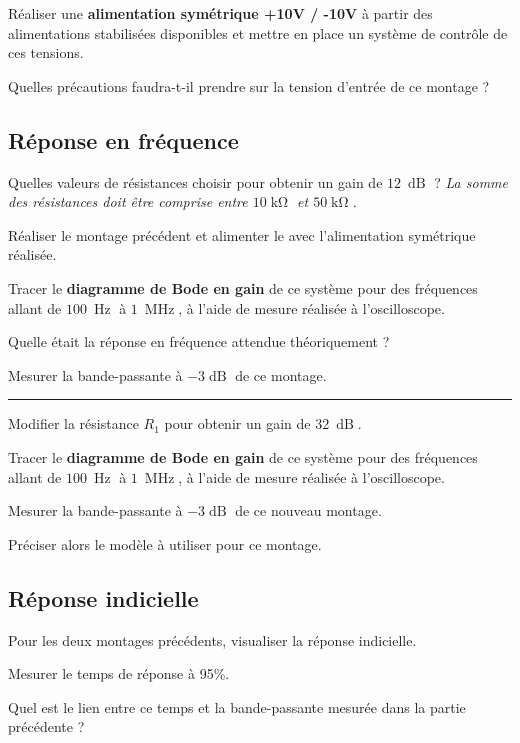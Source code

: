 \Manip Réaliser une \textbf{alimentation symétrique +10V / -10V} à partir des alimentations stabilisées disponibles et mettre en place un système de contrôle de ces tensions.

\Quest Quelles précautions faudra-t-il prendre sur la tension d'entrée de ce montage ?

\subsection{Réponse en fréquence}

\Quest Quelles valeurs de résistances choisir pour obtenir un gain de $12~\operatorname{dB}$ ? \textit{La somme des résistances doit être comprise entre $10\operatorname{k\Omega}$ et $50\operatorname{k\Omega}$.}

\Manip Réaliser le montage précédent et alimenter le avec l'alimentation symétrique réalisée.

\Manip Tracer le \textbf{diagramme de Bode en gain} de ce système pour des fréquences allant de $100~\operatorname{Hz}$ à $1~\operatorname{MHz}$, à l'aide de mesure réalisée à l'oscilloscope. 

\Quest Quelle était la réponse en fréquence attendue théoriquement ? 

\Manip Mesurer la bande-passante à $-3\operatorname{dB}$ de ce montage.

\noindent \rule{\linewidth}{1pt}

\Manip Modifier la résistance $R_1$ pour obtenir un gain de $32~\operatorname{dB}$.

\Manip Tracer le \textbf{diagramme de Bode en gain} de ce système pour des fréquences allant de $100~\operatorname{Hz}$ à $1~\operatorname{MHz}$, à l'aide de mesure réalisée à l'oscilloscope. 

\Manip Mesurer la bande-passante à $-3\operatorname{dB}$ de ce nouveau montage.

\Quest Préciser alors le modèle à utiliser pour ce montage. 


\subsection{Réponse indicielle}

\Manip Pour les deux montages précédents, visualiser la réponse indicielle.

\Manip Mesurer le temps de réponse à 95\%.

\Quest Quel est le lien entre ce temps et la bande-passante mesurée dans la partie précédente ?





